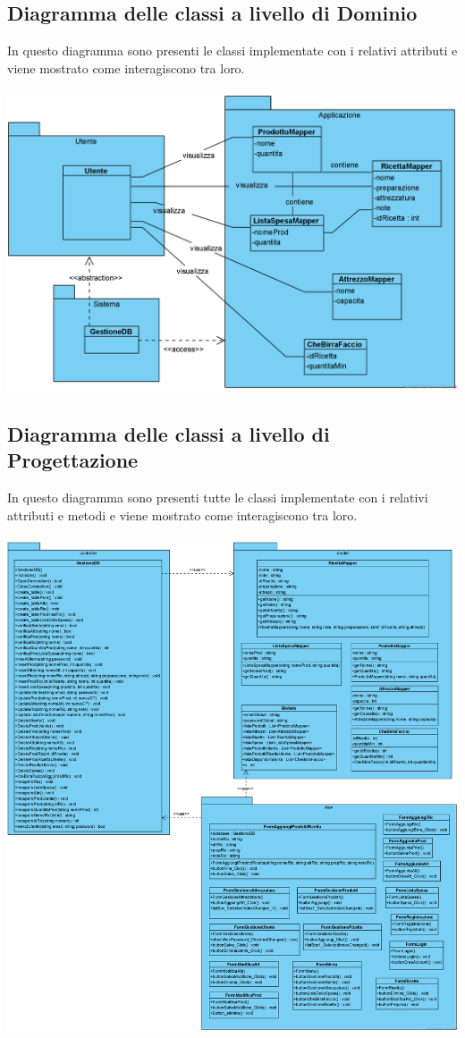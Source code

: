 \documentclass[a4paper, titlepage]{article}
\begin{document}
\subsection{Diagramma delle classi a livello di Dominio}
In questo diagramma sono presenti le classi implementate con i relativi attributi e viene mostrato come interagiscono tra loro.\\\\
\includegraphics[scale=0.50]{Immagini/Domain Model_Brew Day!_definitivo.png}
\subsection{Diagramma delle classi a livello di Progettazione}
In questo diagramma sono presenti tutte le classi implementate con i relativi attributi e metodi e viene mostrato come interagiscono tra loro.\\\\
\includegraphics[scale=0.40]{Immagini/Design Model_Brew Day!_definitivo.png}
\end{document}
